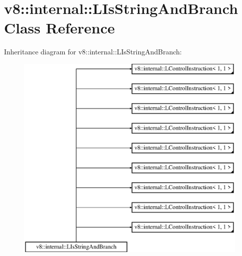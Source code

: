 \hypertarget{classv8_1_1internal_1_1_l_is_string_and_branch}{}\section{v8\+:\+:internal\+:\+:L\+Is\+String\+And\+Branch Class Reference}
\label{classv8_1_1internal_1_1_l_is_string_and_branch}
Inheritance diagram for v8\+:\+:internal\+:\+:L\+Is\+String\+And\+Branch\+:\begin{figure}[H]
\begin{center}
\leavevmode
\includegraphics[height=10.000000cm]{classv8_1_1internal_1_1_l_is_string_and_branch}
\end{center}
\end{figure}
